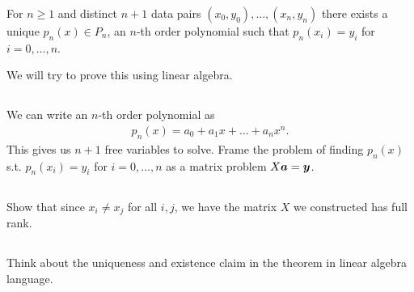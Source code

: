 \documentclass[11pt,letterpaper]{article}
\begin{document}
For $n\geq 1$ and distinct $n+1$ data pairs $(x_0,y_0),\dots,(x_n,y_n)$ there exists a unique $p_n(x)\in P_n$, an $n$-th order polynomial such that $p_n(x_i) = y_i$ for $i = 0,\dots,n$. 

We will try to prove this using linear algebra.

\subsection{}
We can write an $n$-th order polynomial as
\begin{align*}
    p_n(x) = a_0 + a_1x + \dots + a_nx^n.
\end{align*}
This gives us $n+1$ free variables to solve. Frame the problem of finding $p_n(x)$ s.t. $p_n(x_i) = y_i$ for $i = 0,\dots,n$ as a matrix problem $X\boldsymbol{a} = \boldsymbol{y}$.

\subsection{}
Show that since $x_i\neq x_j$ for all $i,j$, we have the matrix $X$ we constructed has full rank. 

\subsection{}
Think about the uniqueness and existence claim in the theorem in linear algebra language. 


\vfill


\end{document}
